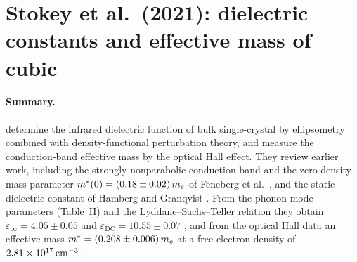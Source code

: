 
\section{Stokey et al.\ (2021): dielectric constants and effective mass of cubic \InO}
\label{sec:lit-stokey2021}

\paragraph{Summary.}
\citet{Stokey2021} determine the infrared dielectric function of bulk single-crystal \InO{} by
ellipsometry combined with density-functional perturbation theory, and measure the conduction-band
effective mass by the optical Hall effect. They review earlier work, including the strongly
nonparabolic conduction band and the zero-density mass parameter $m^{*}(0) = (0.18 \pm 0.02)\,m_e$
of Feneberg et al.\ \citep[p.~225102-2]{Stokey2021}, and the static dielectric constant of Hamberg and
Granqvist \citep[p.~225102-3]{Stokey2021}. From the phonon-mode parameters (Table~II) and the
Lyddane--Sachs--Teller relation they obtain $\varepsilon_\infty = 4.05 \pm 0.05$ and
$\varepsilon_{\mathrm{DC}} = 10.55 \pm 0.07$ \citep[p.~225102-12, Table~II]{Stokey2021}, and from the
optical Hall data an effective mass $m^{*} = (0.208 \pm 0.006)\,m_e$ at a free-electron density of
$2.81\times10^{17}\,\mathrm{cm}^{-3}$ \citep[pp.~225102-12--13]{Stokey2021}.

